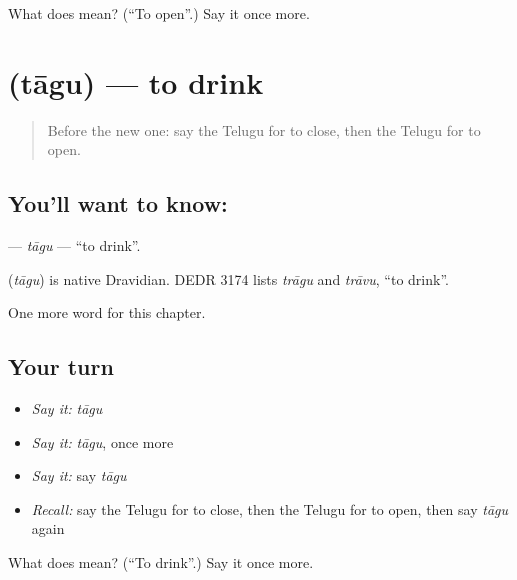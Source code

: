 \begin{tcolorbox}[breakable,colback=teal!4,colframe=teal!35!black,title={Before you move on}]
What does  mean? (\textquotedblleft{}To open\textquotedblright{}.) Say it once more.
\end{tcolorbox}
\section[\texorpdfstring{\te{తాగు} (tāgu)}{తాగు (tāgu)}]{ (tāgu) — to drink}

\label{lesson:TE-C149-tagu}



\begin{quote}
Before the new one: say the Telugu for to close, then the Telugu for to open.
\end{quote}

\subsection*{You'll want to know: }
\textbf{} — \emph{tāgu} — \textquotedblleft{}to drink\textquotedblright{}.

\begin{cousinweb}
\textbf{} (\emph{tāgu}) is native Dravidian. DEDR 3174 lists \emph{trāgu} and \emph{trāvu}, \textquotedblleft{}to drink\textquotedblright{}.
\end{cousinweb}

\begin{grammarlens}[title={What you've built}]
One more word for this chapter.
\end{grammarlens}

\subsection*{Your turn}
\begin{itemize}
\raggedright
  \item \emph{Say it:} \emph{tāgu}
  \item \emph{Say it:} \emph{tāgu}, once more
  \item \emph{Say it:} say \emph{tāgu}
  \item \emph{Recall:} say the Telugu for to close, then the Telugu for to open, then say \emph{tāgu} again
\end{itemize}

\begin{tcolorbox}[breakable,colback=teal!4,colframe=teal!35!black,title={Before you move on}]
What does  mean? (\textquotedblleft{}To drink\textquotedblright{}.) Say it once more.
\end{tcolorbox}
